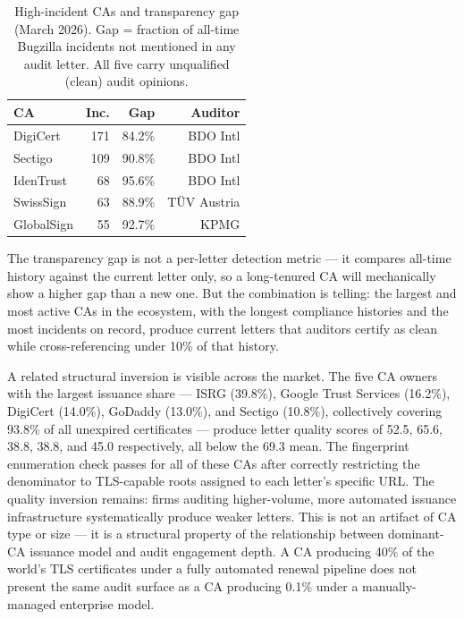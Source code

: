 \documentclass[10pt,twocolumn,letterpaper]{article}
\begin{document}
\begin{table}[t]
\centering
\footnotesize
\setlength{\tabcolsep}{3pt}
\caption{High-incident CAs and transparency gap (March 2026). Gap =
fraction of all-time Bugzilla incidents not mentioned in any audit letter.
All five carry unqualified (clean) audit opinions.}
\label{tab:highgap}
\begin{tabularx}{\columnwidth}{@{}Xrrr@{}}
\toprule
CA & Inc. & Gap & Auditor \\
\midrule
DigiCert             & 171 & 84.2\% & BDO Intl \\
Sectigo              & 109 & 90.8\% & BDO Intl \\
IdenTrust            &  68 & 95.6\% & BDO Intl \\
SwissSign            &  63 & 88.9\% & T\"{U}V Austria \\
GlobalSign           &  55 & 92.7\% & KPMG \\
\bottomrule
\end{tabularx}
\end{table}

The transparency gap is not a per-letter detection metric ---
it compares all-time history against the current letter only, so
a long-tenured CA will mechanically show a higher gap than a new one.
But the combination is telling: the largest and most active CAs in
the ecosystem, with the longest compliance histories and the most
incidents on record, produce current letters that auditors certify
as clean while cross-referencing under 10\% of that history.

A related structural inversion is visible across the market. The
five CA owners with the largest issuance share --- ISRG (39.8\%),
Google Trust Services (16.2\%), DigiCert (14.0\%), GoDaddy (13.0\%),
and Sectigo (10.8\%), collectively covering 93.8\% of all unexpired
certificates --- produce letter quality scores of 52.5, 65.6, 38.8, 38.8, and 45.0 respectively,
all below the 69.3 mean. The fingerprint enumeration check passes for all of
these CAs after correctly restricting the denominator to TLS-capable roots
assigned to each letter's specific URL. The quality inversion remains:
firms auditing higher-volume, more automated issuance infrastructure
systematically produce weaker letters. This is not an artifact of CA type or size ---
it is a structural property of the relationship between dominant-CA
issuance model and audit engagement depth. A CA producing 40\% of
the world's TLS certificates under a fully automated renewal pipeline
does not present the same audit surface as a CA producing 0.1\% under
a manually-managed enterprise model.
\end{document}
